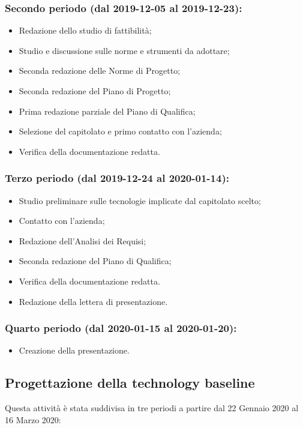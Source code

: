 		\subsubsection{Secondo periodo (dal 2019-12-05 al 2019-12-23):}
		\begin{itemize}
			\item Redazione dello studio di fattibilità;
			\item Studio e discussione sulle norme e strumenti da adottare;
			\item Seconda redazione delle Norme di Progetto;
			\item Seconda redazione del Piano di Progetto;
			\item Prima redazione parziale del Piano di Qualifica;
			\item Selezione del capitolato e primo contatto con l'azienda;
			\item Verifica della documentazione redatta.
		\end{itemize}
		\subsubsection{Terzo periodo (dal 2019-12-24 al 2020-01-14):}
		\begin{itemize}
			\item Studio preliminare sulle tecnologie implicate dal capitolato scelto;
			\item Contatto con l'azienda;
			\item Redazione dell'Analisi dei Requisi;
			\item Seconda redazione del Piano di Qualifica;
			\item Verifica della documentazione redatta.
			\item Redazione della lettera di presentazione.
		\end{itemize}
		\subsubsection{Quarto periodo (dal 2020-01-15 al 2020-01-20):}
		\begin{itemize}
			\item Creazione della presentazione. 
		\end{itemize}

	\subsection{Progettazione della technology baseline}
	Questa attività è stata suddivisa in tre periodi a partire dal 22 Gennaio 2020 al 16 Marzo 2020:

